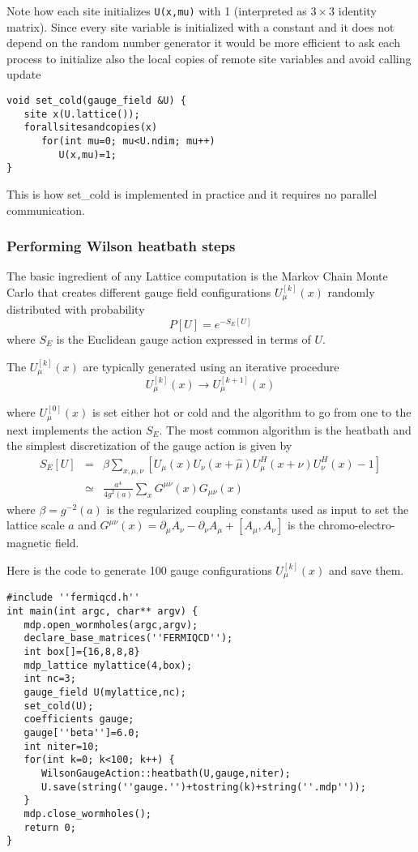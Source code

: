 Note how each site initializes {\tt U(x,mu)} with 1 (interpreted as $3\times
3$ identity matrix). Since every site variable is initialized with a
constant and it does not depend on the random number generator it would be
more efficient to ask each process to initialize also the local copies of
remote site variables and avoid calling update
\begin{verbatim}
void set_cold(gauge_field &U) {
   site x(U.lattice());
   forallsitesandcopies(x)
      for(int mu=0; mu<U.ndim; mu++)
         U(x,mu)=1;
} 
\end{verbatim}

This is how set\_cold is implemented in practice and it requires no parallel
communication.

\subsubsection{Performing Wilson heatbath steps}

The basic ingredient of any Lattice computation is the Markov Chain Monte
Carlo that creates different gauge field configurations $U_\mu ^{[k]}(x)$
randomly distributed with probability 
\[
P[U]=e^{-S_E[U]}
\]
where $S_E$ is the Euclidean gauge action expressed in terms of $U$.

The $U_\mu ^{[k]}(x)$ are typically generated using an iterative procedure
\[
U_\mu ^{[k]}(x)\rightarrow U_\mu ^{[k+1]}(x)
\]

where $U_\mu ^{[0]}(x)$ is set either hot or cold and the algorithm to go
from one to the next implements the action $S_E$. The most common algorithm
is the heatbath and the simplest discretization of the gauge action is given
by
\begin{eqnarray*}
S_E[U] &=&\beta \sum_{x,\mu ,\nu }[U_\mu (x)U_\nu (x+\widehat{\mu })U_\mu
^H(x+\nu )U_\nu ^H(x)-1] \\
&\simeq &\frac{a^4}{4g^2(a)}\sum_xG^{\mu \nu }(x)G_{\mu \nu }(x)
\end{eqnarray*}
where $\beta =g^{-2}(a)$ is the regularized coupling constants used as input
to set the lattice scale $a$ and $G^{\mu \nu }(x)=\partial _\mu A_\nu
-\partial _\nu A_\mu +[A_\mu ,A_\nu ]$ is the chromo-electro-magnetic field.

Here is the code to generate 100 gauge configurations $U_\mu ^{[k]}(x)$ and
save them.
\begin{verbatim}
#include ''fermiqcd.h''
int main(int argc, char** argv) {
   mdp.open_wormholes(argc,argv);
   declare_base_matrices(''FERMIQCD'');
   int box[]={16,8,8,8}
   mdp_lattice mylattice(4,box);
   int nc=3;
   gauge_field U(mylattice,nc);
   set_cold(U);
   coefficients gauge;
   gauge[''beta'']=6.0;
   int niter=10;
   for(int k=0; k<100; k++) {
      WilsonGaugeAction::heatbath(U,gauge,niter);
      U.save(string(''gauge.'')+tostring(k)+string(''.mdp''));
   }
   mdp.close_wormholes();
   return 0;
}
\end{verbatim}

